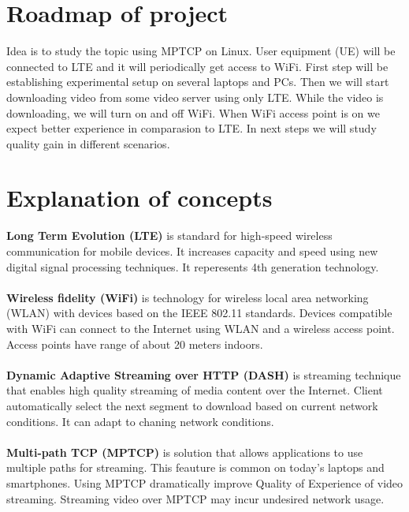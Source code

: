 \documentclass{llncs}
\begin{document}
\section{Roadmap of project}
Idea is to study the topic using MPTCP on Linux. User equipment (UE) will be connected to LTE and it will periodically get access to WiFi. First step will be establishing experimental setup on several laptops and PCs. Then we will start downloading video from some video server using only LTE. While the video is downloading, we will turn on and off WiFi. When WiFi access point is on we expect better experience in comparasion to LTE.  In next steps we will study quality gain in different scenarios. 


\section{Explanation of concepts}
\textbf{Long Term Evolution (LTE)} is standard for high-speed wireless communication for mobile devices. It increases capacity and speed using new digital signal processing techniques. It reperesents 4th generation technology. \\  \\
\textbf{Wireless fidelity (WiFi)} is technology for wireless local area networking (WLAN) with devices based on the IEEE 802.11 standards. Devices compatible with WiFi can connect to the Internet using WLAN and a wireless access point. Access points have range of about 20 meters indoors. \\ \\
\textbf{Dynamic Adaptive Streaming over HTTP (DASH) } is streaming technique that enables high quality streaming of media content over the Internet. Client automatically select the next segment to download based on current network conditions. It can adapt to chaning network conditions.\\  \\
\textbf{Multi-path TCP (MPTCP)} is solution that allows applications to use multiple paths for streaming. This feauture is common on today's laptops and smartphones. Using MPTCP dramatically improve Quality of Experience of video streaming. Streaming video over MPTCP may incur undesired network usage. 





%
%
\end{document}
